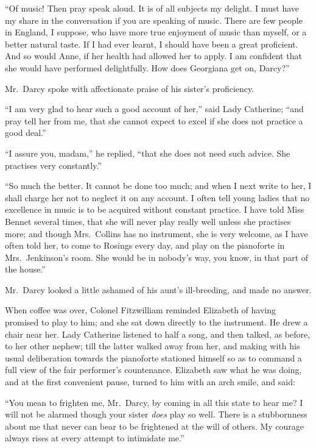\documentclass[12pt,english,oneside]{book}
\begin{document}
{}``Of music! Then pray speak aloud. It is of all subjects my delight.
I must have my share in the conversation if you are speaking of music.
There are few people in England, I suppose, who have more true enjoyment
of music than myself, or a better natural taste. If I had ever learnt,
I should have been a great proficient. And so would Anne, if her health
had allowed her to apply. I am confident that she would have performed
delightfully. How does Georgiana get on, Darcy?''\ 

Mr.\ Darcy spoke with affectionate praise of his sister's proficiency.

{}``I am very glad to hear such a good account of her,'' said Lady
Catherine; {}``and pray tell her from me, that she cannot expect
to excel if she does not practice a good deal.''

{}``I assure you, madam,'' he replied, {}``that she does not need
such advice. She practises very constantly.''

{}``So much the better. It cannot be done too much; and when I next
write to her, I shall charge her not to neglect it on any account.
I often tell young ladies that no excellence in music is to be acquired
without constant practice. I have told Miss Bennet several times,
that she will never play really well unless she practises more; and
though Mrs.\ Collins has no instrument, she is very welcome, as I
have often told her, to come to Rosings every day, and play on the
pianoforte in Mrs.\ Jenkinson's room. She would be in nobody's way,
you know, in that part of the house.''

Mr.\ Darcy looked a little ashamed of his aunt's ill-breeding, and
made no answer.

When coffee was over, Colonel Fitzwilliam reminded Elizabeth of having
promised to play to him; and she sat down directly to the instrument.
He drew a chair near her. Lady Catherine listened to half a song,
and then talked, as before, to her other nephew; till the latter walked
away from her, and making with his usual deliberation towards the
pianoforte stationed himself so as to command a full view of the fair
performer's countenance. Elizabeth saw what he was doing, and at the
first convenient pause, turned to him with an arch smile, and said:

{}``You mean to frighten me, Mr.\ Darcy, by coming in all this state
to hear me? I will not be alarmed though your sister \textit{does}
play so well. There is a stubbornness about me that never can bear
to be frightened at the will of others. My courage always rises at
every attempt to intimidate me.''
\end{document}
